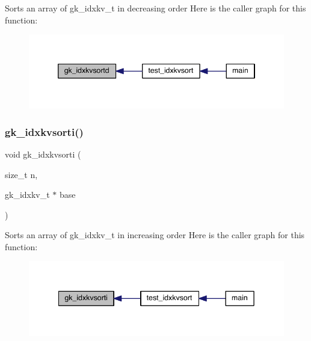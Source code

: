 Sorts an array of gk\+\_\+idxkv\+\_\+t in decreasing order Here is the caller graph for this function\+:\nopagebreak
\begin{figure}[H]
\begin{center}
\leavevmode
\includegraphics[width=346pt]{a00077_a53690cb705b8749f83a8ae609e94aafd_icgraph}
\end{center}
\end{figure}
\mbox{\label{a00077_aacb1df68fc66097ca2646ff5d8be2eaa}} 
\subsubsection{\texorpdfstring{gk\+\_\+idxkvsorti()}{gk\_idxkvsorti()}}
{\footnotesize\ttfamily void gk\+\_\+idxkvsorti (\begin{DoxyParamCaption}\item[{size\+\_\+t}]{n,  }\item[{gk\+\_\+idxkv\+\_\+t $\ast$}]{base }\end{DoxyParamCaption})}

Sorts an array of gk\+\_\+idxkv\+\_\+t in increasing order Here is the caller graph for this function\+:\nopagebreak
\begin{figure}[H]
\begin{center}
\leavevmode
\includegraphics[width=342pt]{a00077_aacb1df68fc66097ca2646ff5d8be2eaa_icgraph}
\end{center}
\end{figure}
\mbox{\label{a00077_a77534ffafbfc5bebe4b527548d60a1ee}} 
